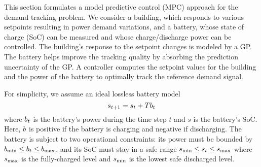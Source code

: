 This section formulates a model predictive control (MPC) approach for the demand tracking problem.
We consider a building, which responds to various setpoints resulting in power demand variations, and a battery, whose state of charge (SoC) can be measured and whose charge/discharge power can be controlled.
The building's response to the setpoint changes is modeled by a GP.
The battery helps improve the tracking quality by absorbing the prediction uncertainty of the GP.
A controller computes the setpoint values for the building and the power of the battery to optimally track the reference demand signal.

For simplicity, we assume an ideal lossless battery model
\begin{equation}
\label{eq:battery-model}
s_{t+1} = s_t + T \Pbatt_t
\end{equation}
where \(b_t\) is the battery's power during the time step \(t\) and \(s\) is the battery's SoC.
Here, \(b\) is positive if the battery is charging and negative if discharging.
The battery is subject to two operational constraints:
its power must be bounded by \(b_{\mathrm{min}} \leq b_t \leq b_{\mathrm{max}}\), 
and its SoC must stay in a safe range \(s_{\mathrm{min}} \leq s_t \leq s_{\mathrm{max}}\) where \(s_{\mathrm{max}}\) is the fully-charged level and \(s_{\mathrm{min}}\) is the lowest safe discharged level. 

